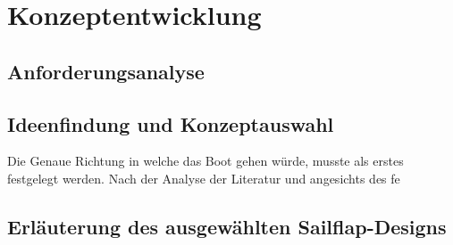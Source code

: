 
\chapter{Konzeptentwicklung }
\label{chap:konzeptentwicklung}


\section{Anforderungsanalyse}
\section{Ideenfindung und Konzeptauswahl}
Die Genaue Richtung in welche das Boot gehen würde, musste als erstes festgelegt werden. Nach der Analyse der Literatur und angesichts des fe
\section{Erläuterung des ausgewählten Sailflap-Designs}



